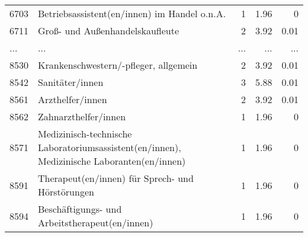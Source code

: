 \begin{longtable}{lXrrr}
        6703 & \multicolumn{1}{X}{Betriebsassistent(en/innen) im Handel o.n.A.} & %
          \num{1} &
          \num[round-mode=places,round-precision=2]{1,96} &
          \num[round-mode=places,round-precision=2]{0} \\
        6711 & \multicolumn{1}{X}{Groß- und Außenhandelskaufleute} & %
          \num{2} &
          \num[round-mode=places,round-precision=2]{3,92} &
          \num[round-mode=places,round-precision=2]{0,01} \\
       ... & ... & ... & ... & ... \\
        8530 & \multicolumn{1}{X}{Krankenschwestern/-pfleger, allgemein} & %
          \num{2} &
          \num[round-mode=places,round-precision=2]{3,92} &
          \num[round-mode=places,round-precision=2]{0,01} \\

        8542 & \multicolumn{1}{X}{Sanitäter/innen} & %
          \num{3} &
          \num[round-mode=places,round-precision=2]{5,88} &
          \num[round-mode=places,round-precision=2]{0,01} \\

        8561 & \multicolumn{1}{X}{Arzthelfer/innen} & %
          \num{2} &
          \num[round-mode=places,round-precision=2]{3,92} &
          \num[round-mode=places,round-precision=2]{0,01} \\

        8562 & \multicolumn{1}{X}{Zahnarzthelfer/innen} & %
          \num{1} &
          \num[round-mode=places,round-precision=2]{1,96} &
          \num[round-mode=places,round-precision=2]{0} \\

        8571 & \multicolumn{1}{X}{Medizinisch-technische Laboratoriumsassistent(en/innen), Medizinische Laboranten(en/innen)} & %
          \num{1} &
          \num[round-mode=places,round-precision=2]{1,96} &
          \num[round-mode=places,round-precision=2]{0} \\

        8591 & \multicolumn{1}{X}{Therapeut(en/innen) für Sprech- und Hörstörungen} & %
          \num{1} &
          \num[round-mode=places,round-precision=2]{1,96} &
          \num[round-mode=places,round-precision=2]{0} \\

        8594 & \multicolumn{1}{X}{Beschäftigungs- und Arbeitstherapeut(en/innen)} & %
          \num{1} &
          \num[round-mode=places,round-precision=2]{1,96} &
          \num[round-mode=places,round-precision=2]{0} \\


\end{longtable}
